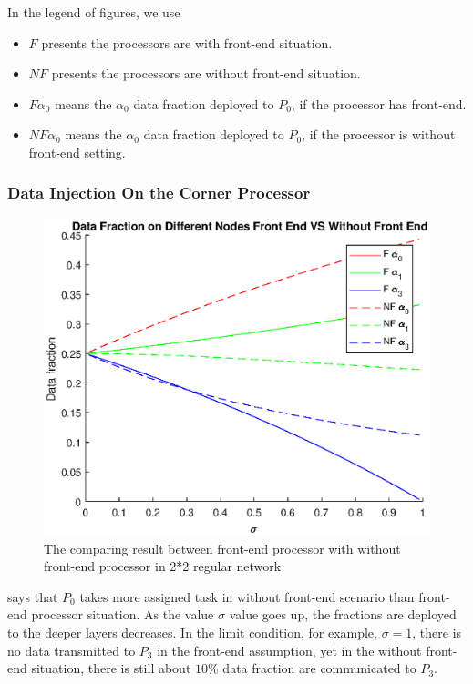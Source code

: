 In the legend of figures,  we use 
\begin{itemize}
\item $F$ presents the processors are with front-end situation.
\item $NF$ presents the processors are without front-end situation.
\item $F\alpha_{0}$ means the $\alpha_{0}$ data fraction deployed to $P_{0}$, if the processor has front-end.
\item $NF\alpha_{0}$ means the $\alpha_{0}$ data fraction deployed to $P_{0}$, if the processor is without front-end setting.
\end{itemize}

\subsubsection{Data Injection On the Corner Processor}

\begin{figure}[!ht]
\centering
\includegraphics[width=1\columnwidth]{figure/2t2_c.eps}
\caption{The comparing result between front-end processor with without front-end processor in 2*2 regular network }
\label{fig:2t2_c}
\end{figure}

 says that $P_{0}$ takes more assigned task in without front-end scenario than front-end processor situation.  As the value $\sigma$ value goes up, the fractions are deployed to the deeper layers decreases.  In the limit condition, for example, $\sigma  = 1$,  there is no data transmitted to $P_{3}$ in the front-end assumption,  yet in the without front-end situation,  there is still about $10\%$ data fraction are communicated to $P_{3}$.  
\newpage

